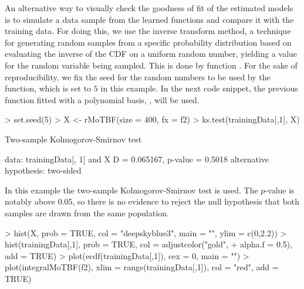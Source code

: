 An alternative way to visually check the goodness of fit of the estimated models is to simulate a data sample from 
the learned functions and compare it with the training data. For doing this, we use the inverse transform method,
a technique for generating random samples from a specific probability distribution based on evaluating the inverse of 
the CDF on a uniform random number, yielding a value for the random variable being sampled. 
This is done by function .
For the sake of reproducibility, we fix the seed for the random numbers to be used by the
 function, which is
set to $5$ in this example. In the next code snippet, the previous function fitted with a polynomial basis, , will be used.

\begin{example}
> set.seed(5)
> X <- rMoTBF(size = 400, fx = f2)
> ks.test(trainingData[,1], X)

Two-sample Kolmogorov-Smirnov test

data:  trainingData[, 1] and X
D = 0.065167, p-value = 0.5018
alternative hypothesis: two-sided
\end{example}

In this example the two-sample Kolmogorov-Smirnov test is used. 
The $p$-value is notably above $0.05$, so there is no evidence to reject the null hypothesis
that both samples are drawn from the same population.

\begin{example}
> hist(X, prob = TRUE, col = "deepskyblue3", main = "", ylim = c(0,2.2))
> hist(trainingData[,1], prob = TRUE, col = adjustcolor("gold", 
+       alpha.f = 0.5), add = TRUE)
> plot(ecdf(trainingData[,1]), cex = 0, main = "")
> plot(integralMoTBF(f2), xlim = range(trainingData[,1]), col = "red", add = TRUE)
\end{example}



